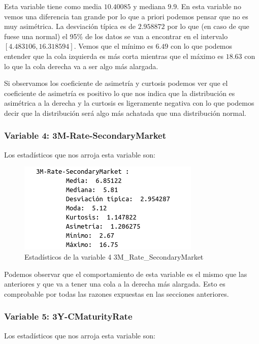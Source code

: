 \documentclass[12pt,a4paper]{article}
\begin{document}
Esta variable tiene como media $10.40085$ y mediana $9.9$. En esta variable no vemos una diferencia tan grande por lo que a priori podemos pensar que no es muy asimétrica. La desviación típica es de $2.958872$ por lo que (en caso de que fuese una normal) el 95\% de los datos se van a encontrar en el intervalo $[4.483106, 16.318594]$. Vemos que el mínimo es $6.49$ con lo que podemos entender que la cola izquierda es más corta mientras que el máximo es $18.63$ con lo que la cola derecha va a ser algo más alargada.

Si observamos los coeficiente de asimetría y curtosis podemos ver que el coeficiente de asimetría es positivo lo que nos indica que la distribución es asimétrica a la derecha y la curtosis es ligeramente negativa con lo que podemos decir que la distribución será algo más achatada que una distribución normal.

\subsubsection*{Variable 4: 3M-Rate-SecondaryMarket}

Los estadísticos que nos arroja esta variable son:

\begin{figure}[H]
	\centering
	\includegraphics[scale=0.7]{./Imagenes/EDA/Regresion/estadisticos_3M_Rate_SecondaryMarket.png}
	\caption{Estadísticos de la variable 4 3M\_Rate\_SecondaryMarket}
\end{figure}

Podemos observar que el comportamiento de esta variable es el mismo que las anteriores y que va a tener una cola a la derecha más alargada. Esto es comprobable por todas las razones expuestas en las secciones anteriores.

\subsubsection*{Variable 5: 3Y-CMaturityRate}

Los estadísticos que nos arroja esta variable son:
\end{document}
